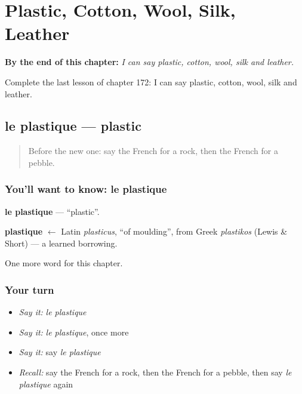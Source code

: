 
\chapter{Plastic, Cotton, Wool, Silk, Leather}
\label{ch:fr-plastic-cotton-wool-silk-leather}

\begin{chapteropening}
\textbf{By the end of this chapter:} \emph{I can say plastic, cotton, wool, silk and leather.}

Complete the last lesson of chapter 172: I can say plastic, cotton, wool, silk and leather.
\end{chapteropening}

\section[le plastique]{le plastique — plastic}

\label{lesson:FR-C172-plastique}



\begin{quote}
Before the new one: say the French for a rock, then the French for a pebble.
\end{quote}

\subsection*{You'll want to know: le plastique}
\textbf{le plastique} — \textquotedblleft{}plastic\textquotedblright{}.

\begin{cousinweb}
\textbf{plastique} $\leftarrow$ Latin \emph{plasticus}, \textquotedblleft{}of moulding\textquotedblright{}, from Greek \emph{plastikos} (Lewis \& Short) — a learned borrowing.
\end{cousinweb}

\begin{grammarlens}[title={What you've built}]
One more word for this chapter.
\end{grammarlens}

\subsection*{Your turn}
\begin{itemize}
\raggedright
  \item \emph{Say it:} \emph{le plastique}
  \item \emph{Say it:} \emph{le plastique}, once more
  \item \emph{Say it:} say \emph{le plastique}
  \item \emph{Recall:} say the French for a rock, then the French for a pebble, then say \emph{le plastique} again
\end{itemize}

